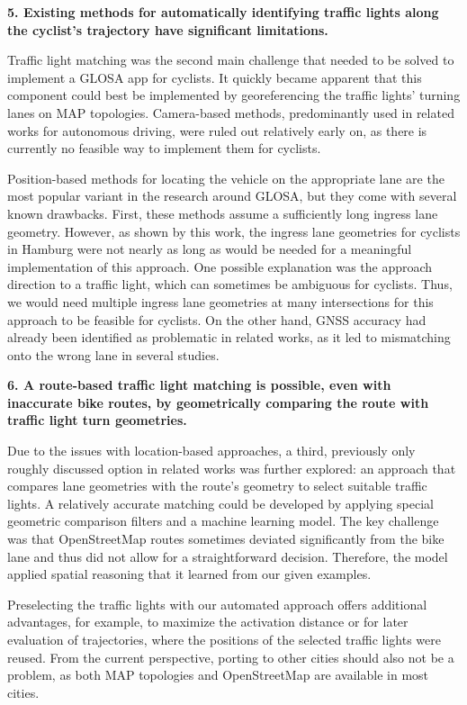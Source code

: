 \textbf{\color{cidarkblue}5. Existing methods for automatically identifying traffic lights along the cyclist's trajectory have significant limitations.} 

Traffic light matching was the second main challenge that needed to be solved to implement a GLOSA app for cyclists. It quickly became apparent that this component could best be implemented by georeferencing the traffic lights' turning lanes on MAP topologies. Camera-based methods, predominantly used in related works for autonomous driving, were ruled out relatively early on, as there is currently no feasible way to implement them for cyclists. 

Position-based methods for locating the vehicle on the appropriate lane are the most popular variant in the research around GLOSA, but they come with several known drawbacks. First, these methods assume a sufficiently long ingress lane geometry. However, as shown by this work, the ingress lane geometries for cyclists in Hamburg were not nearly as long as would be needed for a meaningful implementation of this approach. One possible explanation was the approach direction to a traffic light, which can sometimes be ambiguous for cyclists. Thus, we would need multiple ingress lane geometries at many intersections for this approach to be feasible for cyclists. On the other hand, GNSS accuracy had already been identified as problematic in related works, as it led to mismatching onto the wrong lane in several studies.

\textbf{\color{cidarkblue}6. A route-based traffic light matching is possible, even with inaccurate bike routes, by geometrically comparing the route with traffic light turn geometries.}

Due to the issues with location-based approaches, a third, previously only roughly discussed option in related works was further explored: an approach that compares lane geometries with the route's geometry to select suitable traffic lights. A relatively accurate matching could be developed by applying special geometric comparison filters and a machine learning model. The key challenge was that OpenStreetMap routes sometimes deviated significantly from the bike lane and thus did not allow for a straightforward decision. Therefore, the model applied spatial reasoning that it learned from our given examples.

Preselecting the traffic lights with our automated approach offers additional advantages, for example, to maximize the activation distance or for later evaluation of trajectories, where the positions of the selected traffic lights were reused. From the current perspective, porting to other cities should also not be a problem, as both MAP topologies and OpenStreetMap are available in most cities. 

